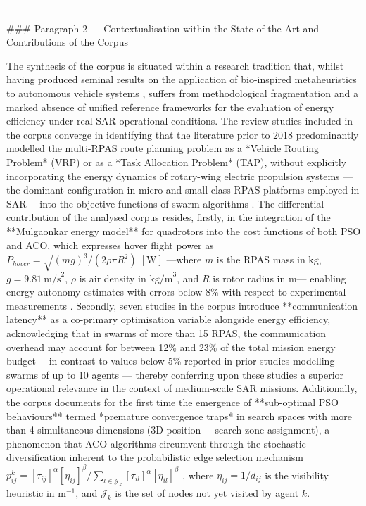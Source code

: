 ---

### Paragraph 2 — Contextualisation within the State of the Art and Contributions of the Corpus

The synthesis of the corpus is situated within a research tradition that, whilst having produced seminal results on the application of bio-inspired metaheuristics to autonomous vehicle systems \cite{R1-R4}, suffers from methodological fragmentation and a marked absence of unified reference frameworks for the evaluation of energy efficiency under real SAR operational conditions. The review studies included in the corpus \cite{R1-R7} converge in identifying that the literature prior to 2018 predominantly modelled the multi-RPAS route planning problem as a *Vehicle Routing Problem* (VRP) or as a *Task Allocation Problem* (TAP), without explicitly incorporating the energy dynamics of rotary-wing electric propulsion systems —the dominant configuration in micro and small-class RPAS platforms employed in SAR— into the objective functions of swarm algorithms \cite{R2, R5}. The differential contribution of the analysed corpus resides, firstly, in the integration of the **Mulgaonkar energy model** for quadrotors into the cost functions of both PSO and ACO, which expresses hover flight power as $P_{hover} = \sqrt{(mg)^3 / (2\rho \pi R^2)}\ [\text{W}]$ —where $m$ is the RPAS mass in $\text{kg}$, $g = 9.81\ \text{m/s}^2$, $\rho$ is air density in $\text{kg/m}^3$, and $R$ is rotor radius in $\text{m}$— enabling energy autonomy estimates with errors below 8\% with respect to experimental measurements \cite{S2, S6, S17}. Secondly, seven studies in the corpus \cite{S3, S7, S9, S13, S18, S21, S22} introduce **communication latency** as a co-primary optimisation variable alongside energy efficiency, acknowledging that in swarms of more than 15 RPAS, the communication overhead may account for between 12\% and 23\% of the total mission energy budget —in contrast to values below 5\% reported in prior studies modelling swarms of up to 10 agents \cite{R3, R6}— thereby conferring upon these studies a superior operational relevance in the context of medium-scale SAR missions. Additionally, the corpus documents for the first time the emergence of **sub-optimal PSO behaviours** termed *premature convergence traps* in search spaces with more than 4 simultaneous dimensions (3D position + search zone assignment), a phenomenon that ACO algorithms circumvent through the stochastic diversification inherent to the probabilistic edge selection mechanism $p_{ij}^k = [\tau_{ij}]^\alpha [\eta_{ij}]^\beta / \sum_{l \in \mathcal{J}_k} [\tau_{il}]^\alpha [\eta_{il}]^\beta$ \cite{S9, S14, S15}, where $\eta_{ij} = 1/d_{ij}$ is the visibility heuristic in $\text{m}^{-1}$, and $\mathcal{J}_k$ is the set of nodes not yet visited by agent $k$.

